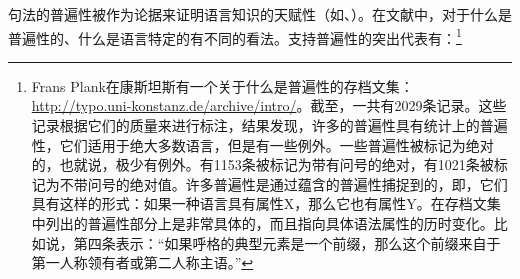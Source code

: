 句法的普遍性被作为论据来证明语言知识的天赋性（如\citealp[]{Chomsky98a-u}、\citealp[--238]{Pinker94a}）。在文献中，对于什么是普遍性的、什么是语言特定的有不同的看法。支持普遍性的突出代表有：\footnote{%
Frans Plank在康斯坦斯有一个关于什么是普遍性的存档文集\citep{PF2000a}：\url{http://typo.uni-konstanz.de/archive/intro/}。截至，一共有2029条记录。这些记录根据它们的质量来进行标注，结果发现，许多的普遍性具有统计上的普遍性，它们适用于绝大多数语言，但是有一些例外。一些普遍性被标记为绝对的，也就说，极少有例外。有1153条被标记为带有问号的绝对，有1021条被标记为不带问号的绝对值。许多普遍性是通过蕴含的普遍性捕捉到的，即，它们具有这样的形式：如果一种语言具有属性X，那么它也有属性Y。在存档文集中列出的普遍性部分上是非常具体的，而且指向具体语法属性的历时变化。比如说，第四条表示：“如果呼格的典型元素是一个前缀，那么这个前缀来自于第一人称领有者或第二人称主语。”
}\nocite{Harbour2011a}

